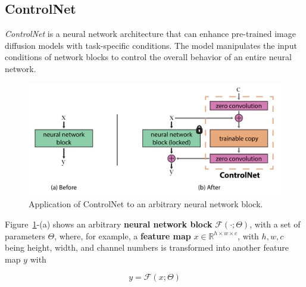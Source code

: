 \documentclass[preprint]{elsarticle}
\begin{document}
\subsection{ControlNet}
\emph{ControlNet} \cite{zhang2023adding} is a neural network architecture that can enhance 
pre-trained image diffusion models with task-specific conditions. 
The model manipulates the input conditions of network blocks to control the overall behavior of an entire neural network.

\begin{figure}[b]
	\centering
    \includegraphics[scale=0.8]{img/svg/Controlnet1.png}
	\caption{Application of ControlNet to an arbitrary neural network block.}\label{fig:controlnet}
\end{figure}


Figure~\ref{fig:controlnet}-(a) shows an arbitrary \textbf{neural network block} $\mathcal{F}(\cdot;\Theta)$, 
with a set of parameters $\Theta$,
where, for example, a \textbf{feature map} $x \in \mathbb{R}^{h\times w \times c}$, with ${h,w,c}$ 
being height, width, and channel numbers
is transformed into another feature map $y$ with

\begin{equation}
	y = \mathcal{F}(x;\Theta)
\end{equation}
\end{document}
